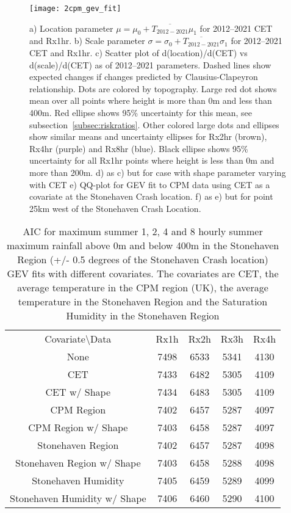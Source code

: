 \begin{figure}[H]
    \centering
    \texttt{[image: 2cpm\_gev\_fit]}
    \caption{a) Location parameter $\mu = \mu_0 + \overline{T_{2012-2021}}\mu_1$  for 2012--2021 CET and Rx1hr.
    b) Scale parameter $\sigma = \sigma_0 + \overline{T_{2012-2021}}\sigma_1$ for 2012--2021 CET and Rx1hr.
    c) Scatter plot of d(location)/d(CET) vs d(scale)/d(CET) as of 2012--2021 parameters.
    Dashed lines show expected changes if changes predicted by Clausius-Clapeyron relationship.
    Dots are colored by topography.
    Large red dot shows mean over all points where height is more than 0m and less than 400m.
    Red ellipse shows 95\% uncertainty for this mean, see subsection~\ref{subsec:riskratios}.
    Other colored large dots and ellipses show similar means and uncertainty ellipses for Rx2hr (brown), Rx4hr (purple) and Rx8hr (blue).
    Black ellipse shows 95\% uncertainty for all Rx1hr points where height is less than 0m and more than 200m.
    d) as c) but for case with shape parameter varying with CET
    e) QQ-plot for GEV fit to CPM data using CET as a covariate at the Stonehaven Crash location.
    f) as e) but for point 25km west of the Stonehaven Crash Location.}
    \label{fig:2cpm_gev_fit}
\end{figure}
\begin{table}[H]
    \centering
    \begin{tabular}{c c c c c}
        Covariate\textbackslash Data & Rx1h & Rx2h & Rx3h & Rx4h \\
        None &7498&6533&5341&4130 \\
        CET &7433&6482&5305&4109 \\
        CET w/ Shape &7434&6483&5305&4109 \\
        CPM Region &7402&6457&5287&4097 \\
        CPM Region w/ Shape &7403&6458&5287&4097 \\
        Stonehaven Region &7402&6457&5287&4098 \\
        Stonehaven Region w/ Shape &7403&6458&5288&4098 \\
        Stonehaven Humidity &7405&6459&5289&4099 \\
        Stonehaven Humidity w/ Shape &7406&6460&5290&4100 \\
    \end{tabular}
    \caption{AIC for maximum summer 1, 2, 4 and 8 hourly summer maximum rainfall
        above 0m and below 400m in the Stonehaven Region (+/- 0.5 degrees of the Stonehaven Crash location)
        GEV fits with different covariates.
    The covariates are CET, the average temperature in the CPM region (UK),
    the average temperature in the Stonehaven Region and
    the Saturation Humidity in the Stonehaven Region}
    \label{tab:AICtable}
\end{table}

